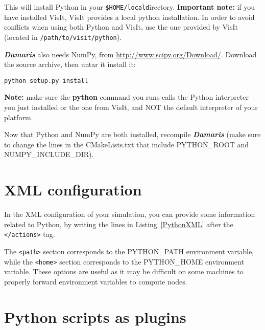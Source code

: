 \documentclass[11pt]{report}
\newcommand{\Damaris}{\emph{\textbf{Damaris}}}
\newcommand{\installdir}[1]{\texttt{\$HOME/local#1}}
\begin{document}
This will install Python in your \installdir directory. \textbf{Important note:} if you have installed VisIt,
VisIt provides a local python installation. In order to avoid conflicts when using both Python and VisIt,
use the one provided by VisIt (located in \texttt{/path/to/visit/python}).

\Damaris{} also needs NumPy, from \url{http://www.scipy.org/Download/}. Download the source archive,
then untar it install it:

\begin{verbatim}
python setup.py install
\end{verbatim}
\textbf{Note:} make sure the \textbf{python} command you runs calls the Python interpreter you just installed
or the one from VisIt, and NOT the default interpreter of your platform.

Now that Python and NumPy are both installed, recompile \Damaris{} (make sure to change
the lines in the CMakeLists.txt that include PYTHON\_ROOT and NUMPY\_INCLUDE\_DIR).

\section{XML configuration}

In the XML configuration of your simulation, you can provide some information related to
Python, by writing the lines in Listing~\ref{PythonXML} after the \texttt{</actions>} tag.

\noindent\begin{minipage}{\textwidth}
\vspace{0.5cm}

\end{minipage}

The \texttt{<path>} section corresponds to the PYTHON\_PATH environment variable,
while the \texttt{<home>} section corresponds to the PYTHON\_HOME environment variable.
These options are useful as it may be difficult on some machines to properly forward environment
variables to compute nodes.

\section{Python scripts as plugins}
\end{document}
